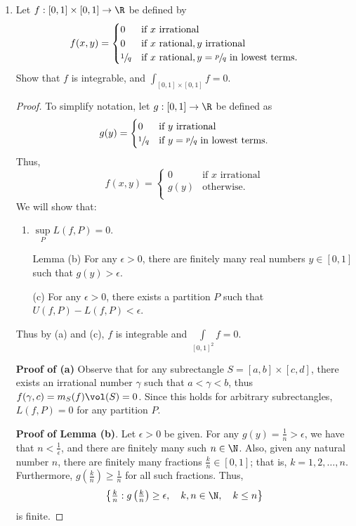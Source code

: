 \documentclass[letterpaper]{article}
\begin{document}
\begin{enumerate}
\item Let $f:[0,1]\times[0,1]\to \R$ be defined by 
\[
f(x,y)=
\begin{cases}
0 & \text{if } x \text{ irrational}\\
0 & \text{if } x \text{ rational}, y \text{ irrational}\\
\sfrac{1}{q} & \text{if } x \text{ rational}, y=\sfrac{p}{q} \text{ in lowest terms.}\\
\end{cases}
\]
Show that $f$ is integrable, and $\int_{[0,1]\times[0,1]}f=0$. 
\begin{proof}
To simplify notation, let $g:[0,1]\to \R$ be defined as
\[
g(y)=
\begin{cases}
0 & \text{if } y \text{ irrational}\\
\sfrac{1}{q} & \text{if } y=\sfrac{p}{q} \text{ in lowest terms.}\\
\end{cases}
\]
Thus, 
\[
f(x,y)=
\begin{cases}
0 & \text{if } x \text{ irrational}\\
g(y) & \text{otherwise.}\\
\end{cases}
\]
We will show that:
\begin{enumerate}
\item $\sup\limits_P L(f,P)=0$.
\item [Lemma (b)] For any $\epsilon>0$, there are finitely many real numbers $y\in[0,1]$ such that $g(y)>\epsilon$. 
\item [(c)] For any $\epsilon>0$, there exists a partition $P$ such that $U(f,P)-L(f,P)<\epsilon$. 
\end{enumerate}
Thus by (a) and (c), $f$ is integrable and $\int\limits_{[0,1]^2}f=0$. 

\textbf{Proof of (a)} Observe that for any subrectangle $S=[a,b]\times[c,d]$, there exists an irrational number $\gamma$ such that $a<\gamma<b$, thus $f(\gamma, c)= m_S(f)\vol(S)=0$. Since this holds for arbitrary subrectangles, $L(f,P)=0$ for any partition $P$. \qedwhite

\textbf{Proof of Lemma (b)}. Let $\epsilon>0$ be given. For any $g(y)=\frac{1}{n}>\epsilon$, we have that $n<\frac{1}{\epsilon}$, and there are finitely many such $n\in\N$. Also, given any natural number $n$, there are finitely many fractions $\frac{k}{n}\in[0,1]$; that is, $k=1, 2, \dots, n$. Furthermore, $g\left(\frac{k}{n}\right)\geq\frac{1}{n}$ for all such fractions. Thus, $$\left\lbrace  \tfrac{k}{n} : g\left(\tfrac{k}{n}\right)\geq\epsilon, \quad k,n\in\N, \quad k\leq n\right\rbrace$$ is finite. \qedwhite



\end{proof}
\end{enumerate}
\end{document}
